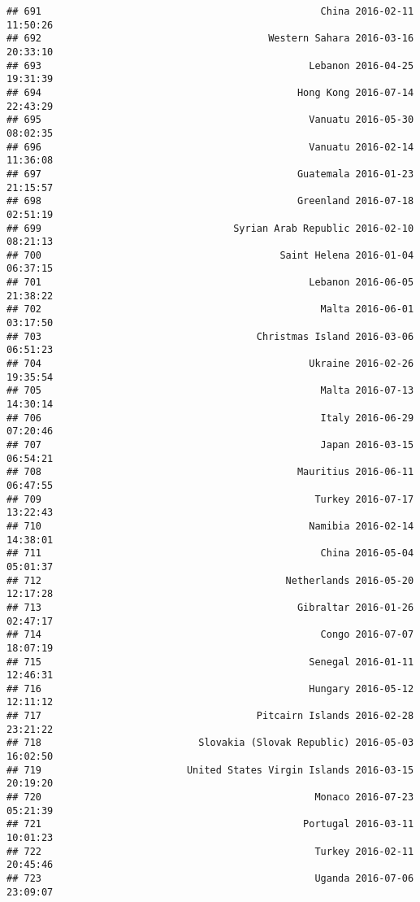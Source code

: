 \documentclass[
]{article}
\begin{document}
\begin{verbatim}
## 691                                                China 2016-02-11 11:50:26
## 692                                       Western Sahara 2016-03-16 20:33:10
## 693                                              Lebanon 2016-04-25 19:31:39
## 694                                            Hong Kong 2016-07-14 22:43:29
## 695                                              Vanuatu 2016-05-30 08:02:35
## 696                                              Vanuatu 2016-02-14 11:36:08
## 697                                            Guatemala 2016-01-23 21:15:57
## 698                                            Greenland 2016-07-18 02:51:19
## 699                                 Syrian Arab Republic 2016-02-10 08:21:13
## 700                                         Saint Helena 2016-01-04 06:37:15
## 701                                              Lebanon 2016-06-05 21:38:22
## 702                                                Malta 2016-06-01 03:17:50
## 703                                     Christmas Island 2016-03-06 06:51:23
## 704                                              Ukraine 2016-02-26 19:35:54
## 705                                                Malta 2016-07-13 14:30:14
## 706                                                Italy 2016-06-29 07:20:46
## 707                                                Japan 2016-03-15 06:54:21
## 708                                            Mauritius 2016-06-11 06:47:55
## 709                                               Turkey 2016-07-17 13:22:43
## 710                                              Namibia 2016-02-14 14:38:01
## 711                                                China 2016-05-04 05:01:37
## 712                                          Netherlands 2016-05-20 12:17:28
## 713                                            Gibraltar 2016-01-26 02:47:17
## 714                                                Congo 2016-07-07 18:07:19
## 715                                              Senegal 2016-01-11 12:46:31
## 716                                              Hungary 2016-05-12 12:11:12
## 717                                     Pitcairn Islands 2016-02-28 23:21:22
## 718                           Slovakia (Slovak Republic) 2016-05-03 16:02:50
## 719                         United States Virgin Islands 2016-03-15 20:19:20
## 720                                               Monaco 2016-07-23 05:21:39
## 721                                             Portugal 2016-03-11 10:01:23
## 722                                               Turkey 2016-02-11 20:45:46
## 723                                               Uganda 2016-07-06 23:09:07

\end{verbatim}
\end{document}
